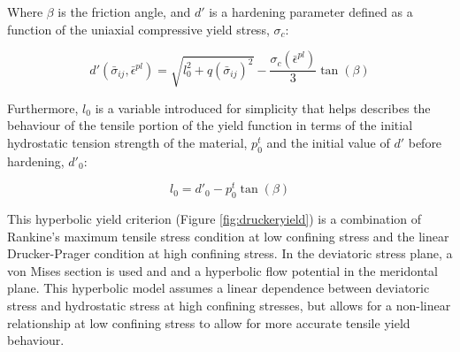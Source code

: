 Where $\beta$ is the friction angle, and $d'$ is a hardening parameter defined as a function of the uniaxial compressive yield stress, $\sigma_c$:

\begin{equation}
d'\left(\bar{\sigma}_{ij}, \bar{\epsilon}^{pl}\right)=\sqrt{l_{0}^{2}+q\left(\bar{\sigma}_{ij}\right)^{2}}-\frac{\sigma_c\left(\bar{\epsilon}^{pl}\right)}{3}\tan\left(\beta\right)
\label{eqn:druc2-2}
\end{equation}

Furthermore, $l_0$ is a variable introduced for simplicity that helps describes the behaviour of the tensile portion of the yield function in terms of the initial hydrostatic tension strength of the material, $p_{0}^{t}$ and the initial value of $d'$ before hardening, $d'_{0}$: 

\begin{equation}
l_{0}=d'_{0}-p_{0}^{t}\tan\left(\beta\right)\label{eqn:druc2-1}
\end{equation}

This hyperbolic yield criterion (Figure \ref{fig:druckeryield}) is a combination of Rankine's maximum tensile stress condition at low confining stress and the linear Drucker-Prager condition at high confining stress. In the deviatoric stress plane, a von Mises section is used and and a hyperbolic flow potential in the meridontal plane. This hyperbolic model assumes a linear dependence between deviatoric stress and hydrostatic stress at high confining stresses, but allows for a non-linear relationship at low confining stress to allow for more accurate tensile yield behaviour.

